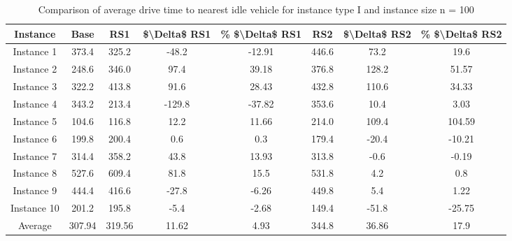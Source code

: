 \begin{table}[H]
\centering
\begin{tabular}{cccccccc}
  \hline
  \textbf{Instance} & \textbf{Base} & \textbf{RS1} & \textbf{\$\textbackslash{}Delta\$  RS1} & \textbf{\% \$\textbackslash{}Delta\$  RS1} & \textbf{RS2} & \textbf{\$\textbackslash{}Delta\$  RS2} & \textbf{\% \$\textbackslash{}Delta\$  RS2} \\\hline
  Instance 1 & 373.4 & 325.2 & -48.2 & -12.91 & 446.6 & 73.2 & 19.6 \\
  Instance 2 & 248.6 & 346.0 & 97.4 & 39.18 & 376.8 & 128.2 & 51.57 \\
  Instance 3 & 322.2 & 413.8 & 91.6 & 28.43 & 432.8 & 110.6 & 34.33 \\
  Instance 4 & 343.2 & 213.4 & -129.8 & -37.82 & 353.6 & 10.4 & 3.03 \\
  Instance 5 & 104.6 & 116.8 & 12.2 & 11.66 & 214.0 & 109.4 & 104.59 \\
  Instance 6 & 199.8 & 200.4 & 0.6 & 0.3 & 179.4 & -20.4 & -10.21 \\
  Instance 7 & 314.4 & 358.2 & 43.8 & 13.93 & 313.8 & -0.6 & -0.19 \\
  Instance 8 & 527.6 & 609.4 & 81.8 & 15.5 & 531.8 & 4.2 & 0.8 \\
  Instance 9 & 444.4 & 416.6 & -27.8 & -6.26 & 449.8 & 5.4 & 1.22 \\
  Instance 10 & 201.2 & 195.8 & -5.4 & -2.68 & 149.4 & -51.8 & -25.75 \\
  Average & 307.94 & 319.56 & 11.62 & 4.93 & 344.8 & 36.86 & 17.9 \\\hline
\end{tabular}
\caption{Comparison of average drive time to nearest idle vehicle for instance type I and instance size n = 100}
\label{tab:wait:resrelocation-nearest-drive-time-comparison_I_100}
\end{table}

